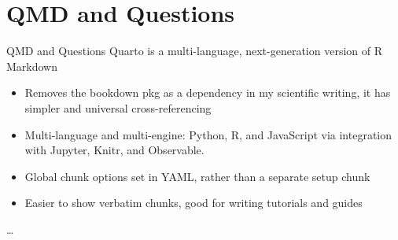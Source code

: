 \documentclass[
  ignorenonframetext,
]{beamer}
\begin{document}
\section{QMD and Questions}\label{qmd-and-questions}

\begin{frame}{QMD and Questions}
Quarto is a multi-language, next-generation version of R Markdown

\begin{itemize}
\item
  Removes the bookdown pkg as a dependency in my scientific writing, it
  has simpler and universal cross-referencing
\item
  Multi-language and multi-engine: Python, R, and JavaScript via
  integration with Jupyter, Knitr, and Observable.
\item
  Global chunk options set in YAML, rather than a separate setup chunk
\item
  Easier to show verbatim chunks, good for writing tutorials and guides
\end{itemize}

\ldots{}
\end{frame}
\end{document}
